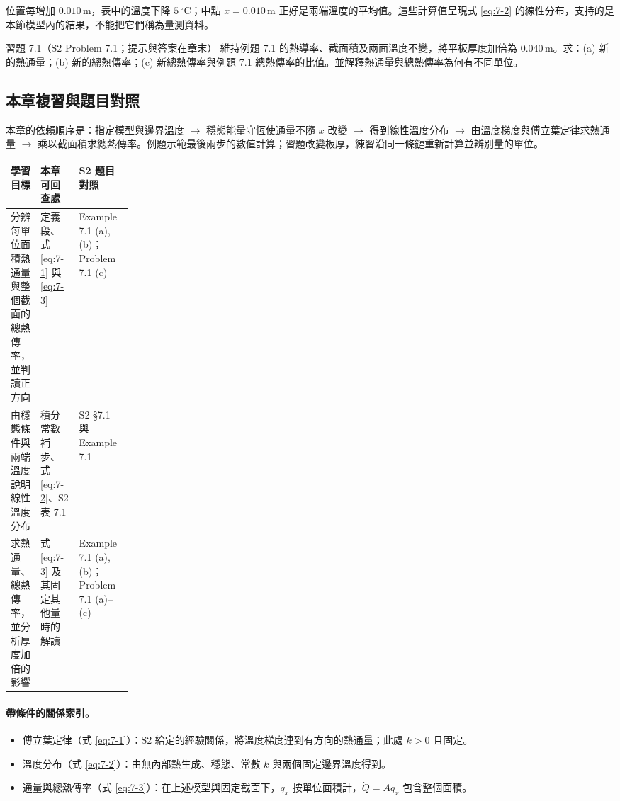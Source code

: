 位置每增加 \(0.010\,\mathrm m\)，表中的溫度下降 \(5\,^{\circ}\mathrm C\)；中點 \(x=0.010\,\mathrm m\) 正好是兩端溫度的平均值。這些計算值呈現式 \eqref{eq:7-2} 的線性分布，支持的是本節模型內的結果，不能把它們稱為量測資料。

\begin{selftestbox}{習題 7.1（S2 Problem 7.1；提示與答案在章末）}
維持例題 7.1 的熱導率、截面積及兩面溫度不變，將平板厚度加倍為 \(0.040\,\mathrm m\)。求：(a) 新的熱通量；(b) 新的總熱傳率；(c) 新總熱傳率與例題 7.1 總熱傳率的比值。並解釋熱通量與總熱傳率為何有不同單位。
\end{selftestbox}
\subsection*{本章複習與題目對照}
本章的依賴順序是：指定模型與邊界溫度 \(\longrightarrow\) 穩態能量守恆使通量不隨 \(x\) 改變 \(\longrightarrow\) 得到線性溫度分布 \(\longrightarrow\) 由溫度梯度與傅立葉定律求熱通量 \(\longrightarrow\) 乘以截面積求總熱傳率。例題示範最後兩步的數值計算；習題改變板厚，練習沿同一條鏈重新計算並辨別量的單位。

\begin{center}
\begin{tabularx}{\linewidth}{p{0.20\linewidth} X X}
\toprule
學習目標 & 本章可回查處 & S2 題目對照 \\
\midrule
分辨每單位面積熱通量與整個截面的總熱傳率，並判讀正方向 & 定義段、式 \eqref{eq:7-1} 與 \eqref{eq:7-3} & Example 7.1 (a), (b)；Problem 7.1 (c) \\
由穩態條件與兩端溫度說明線性溫度分布 & 積分常數補步、式 \eqref{eq:7-2}、S2 表 7.1 & S2 §7.1 與 Example 7.1 \\
求熱通量、總熱傳率，並分析厚度加倍的影響 & 式 \eqref{eq:7-3} 及其固定其他量時的解讀 & Example 7.1 (a), (b)；Problem 7.1 (a)–(c) \\
\bottomrule
\end{tabularx}
\end{center}

\paragraph{帶條件的關係索引。}
\begin{itemize}
\item 傅立葉定律（式 \eqref{eq:7-1}）：S2 給定的經驗關係，將溫度梯度連到有方向的熱通量；此處 \(k>0\) 且固定。
\item 溫度分布（式 \eqref{eq:7-2}）：由無內部熱生成、穩態、常數 \(k\) 與兩個固定邊界溫度得到。
\item 通量與總熱傳率（式 \eqref{eq:7-3}）：在上述模型與固定截面下，\(q_x\) 按單位面積計，\(\dot Q=Aq_x\) 包含整個面積。
\end{itemize}

